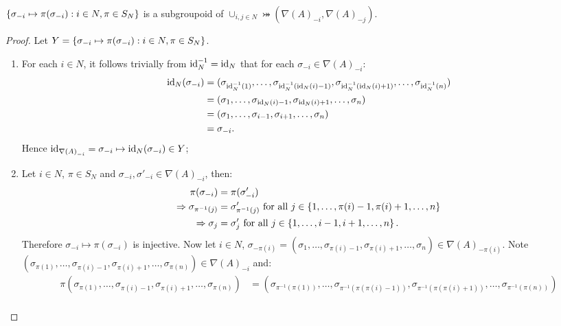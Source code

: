 \begin{proposition} \label{prop:secondgroupoidprop}
	$\left\{\sigma_{-i} \mapsto \pi(\sigma_{-i}): i \in N, \pi \in S_N\right\}$ is a subgroupoid of $\cup_{i, j \in N}\bij({\nabla(A)}_{-i}, {\nabla(A)}_{-j})$.
	
	\begin{proof}
		Let $Y = \left\{\sigma_{-i} \mapsto \pi(\sigma_{-i}): i \in N, \pi \in S_N\right\}$.

		\begin{enumerate}
			\item For each $i \in N$, it follows trivially from $\text{id}_N^{-1} = \text{id}_N$ that for each $\sigma_{-i} \in {\nabla(A)}_{-i}$:
			\begin{align*}
				\textstyle\text{id}_N(\sigma_{-i}) &= (\sigma_{\text{id}_N^{-1}(1)}, \ldots, \sigma_{\text{id}_N^{-1}\left(\text{id}_N(i)-1\right)}, \sigma_{\text{id}_N^{-1}\left(\text{id}_N(i)+1\right)}, \ldots, \sigma_{\text{id}_N^{-1}(n)})\\
				&= (\sigma_1, \ldots, \sigma_{\text{id}_N(i)-1}, \sigma_{\text{id}_N(i)+1}, \ldots, \sigma_n)\\
				&= (\sigma_1, \ldots, \sigma_{i-1}, \sigma_{i+1}, \ldots, \sigma_n) \\
				&= \sigma_{-i}.
			\end{align*}
			Hence $\text{id}_{{\nabla(A)}_{-i}} = \sigma_{-i} \mapsto \text{id}_N(\sigma_{-i}) \in Y$;
			\item Let $i \in N$, $\pi \in S_N$ and $\sigma_{-i}, \sigma'_{-i} \in {\nabla(A)}_{-i}$, then:
			\begin{align*}
				\pi(\sigma_{-i}) &= \pi(\sigma'_{-i}) \\
				\Rightarrow \sigma_{\pi^{-1}(j)} &= \sigma'_{\pi^{-1}(j)} \text{ for all } j \in \left\{1, \ldots, \pi(i)-1, \pi(i)+1, \ldots, n\right\} \\
				\Rightarrow \sigma_j &= \sigma'_j \text{ for all } j \in \left\{1, \ldots, i-1, i+1, \ldots, n\right\}.
			\end{align*}			
			Therefore $\sigma_{-i} \mapsto \pi(\sigma_{-i})$ is injective. Now let $i \in N$, $\sigma_{-\pi(i)} = (\sigma_1, \ldots, \sigma_{\pi(i)-1}, \sigma_{\pi(i)+1}, \ldots, \sigma_n) \in {\nabla(A)}_{-\pi(i)}$. Note $(\sigma_{\pi(1)}, \ldots, \sigma_{\pi(i)-1}, \sigma_{\pi(i)+1}, \ldots, \sigma_{\pi(n)}) \in {\nabla(A)}_{-i}$ and:
			\begin{align*}
				\pi(\sigma_{\pi(1)}, \ldots, \sigma_{\pi(i)-1}, \sigma_{\pi(i)+1}, \ldots, \sigma_{\pi(n)}) &= (\sigma_{\pi^{-1}(\pi(1))}, \ldots, \sigma_{\pi^{-1}(\pi(\pi(i)-1))}, \sigma_{\pi^{-1}(\pi(\pi(i)+1))}, \ldots, \sigma_{\pi^{-1}(\pi(n))})\\

\end{align*}
\end{enumerate}
\end{proof}
\end{proposition}
